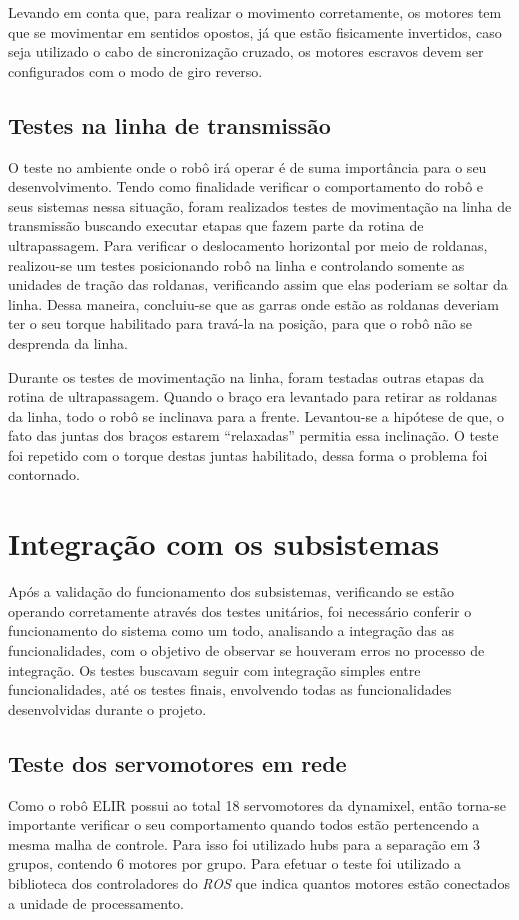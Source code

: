 Levando em conta que, para realizar o movimento corretamente, os motores tem que se movimentar em sentidos opostos, já que estão fisicamente invertidos, caso seja utilizado o cabo de sincronização cruzado, os motores escravos devem ser configurados com o modo de giro reverso.

\subsection{Testes na linha de transmissão}\label{sec:test_mov_lin}
O teste no ambiente onde o robô irá operar é de suma importância para o seu desenvolvimento. Tendo como finalidade verificar o comportamento do robô e seus sistemas  nessa situação, foram realizados testes de movimentação na linha de transmissão buscando executar etapas que fazem parte da rotina de ultrapassagem. Para verificar o deslocamento horizontal por meio de roldanas, realizou-se um testes posicionando robô na linha e controlando somente as unidades de tração das roldanas, verificando assim que elas poderiam se soltar da linha. Dessa maneira, concluiu-se que as garras onde estão as roldanas deveriam ter o seu torque habilitado para travá-la na posição, para que o robô não se desprenda da linha.

Durante os testes de movimentação na linha, foram testadas outras etapas da rotina de ultrapassagem. Quando o braço era levantado para retirar as roldanas da linha, todo o robô se inclinava para a frente.  Levantou-se a hipótese de que, o fato das juntas dos braços estarem “relaxadas” permitia essa inclinação. O teste foi repetido com o torque destas juntas habilitado, dessa forma o problema foi contornado.



\section{Integração com os subsistemas}\label{sec:int_subsis}
Após a validação do funcionamento dos subsistemas, verificando se estão operando corretamente através dos testes unitários, foi necessário conferir o funcionamento do sistema como um todo, analisando a integração das as funcionalidades, com o objetivo de observar se houveram erros no processo de integração. Os testes buscavam seguir com integração simples entre funcionalidades, até os testes finais, envolvendo todas as funcionalidades desenvolvidas durante o projeto.

\subsection{Teste dos servomotores em rede}\label{sec:test_serv_red}
Como o robô ELIR possui ao total 18 servomotores da dynamixel, então torna-se  importante verificar o seu comportamento quando todos estão pertencendo a mesma malha de controle. Para isso foi utilizado hubs para a separação em 3 grupos, contendo 6 motores por grupo. Para efetuar o teste foi utilizado a biblioteca dos controladores do \textit{ROS} que indica quantos motores estão conectados a unidade de processamento.

